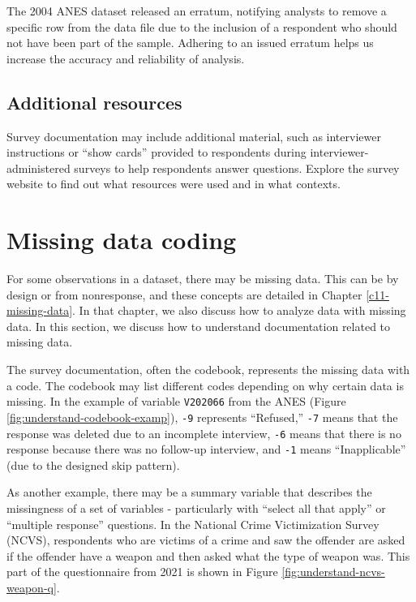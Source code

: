 \documentclass[
]{krantz}
\begin{document}
The 2004 ANES dataset released an erratum, notifying analysts to remove a specific row from the data file due to the inclusion of a respondent who should not have been part of the sample. Adhering to an issued erratum helps us increase the accuracy and reliability of analysis.

\hypertarget{additional-resources}{%
\subsection{Additional resources}\label{additional-resources}}

Survey documentation may include additional material, such as interviewer instructions or ``show cards'' provided to respondents during interviewer-administered surveys to help respondents answer questions. Explore the survey website to find out what resources were used and in what contexts.

\hypertarget{missing-data-coding}{%
\section{Missing data coding}\label{missing-data-coding}}

For some observations in a dataset, there may be missing data. This can be by design or from nonresponse, and these concepts are detailed in Chapter \ref{c11-missing-data}. In that chapter, we also discuss how to analyze data with missing data. In this section, we discuss how to understand documentation related to missing data.

The survey documentation, often the codebook, represents the missing data with a code. The codebook may list different codes depending on why certain data is missing. In the example of variable \texttt{V202066} from the ANES (Figure \ref{fig:understand-codebook-examp}), \texttt{-9} represents ``Refused,'' \texttt{-7} means that the response was deleted due to an incomplete interview, \texttt{-6} means that there is no response because there was no follow-up interview, and \texttt{-1} means ``Inapplicable'' (due to the designed skip pattern).

As another example, there may be a summary variable that describes the missingness of a set of variables - particularly with ``select all that apply'' or ``multiple response'' questions. In the National Crime Victimization Survey (NCVS), respondents who are victims of a crime and saw the offender are asked if the offender have a weapon and then asked what the type of weapon was. This part of the questionnaire from 2021 is shown in Figure \ref{fig:understand-ncvs-weapon-q}.
\end{document}
